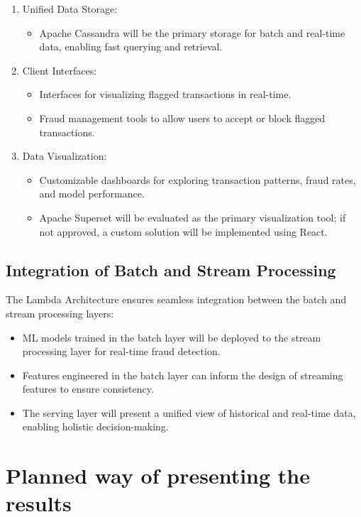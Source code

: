\documentclass[12pt,a4paper, hidelinks]{article}
\begin{document}
\begin{enumerate}
    \item Unified Data Storage:
        \begin{itemize}
            \item Apache Cassandra will be the primary storage for batch and real-time data, enabling fast querying and retrieval.
        \end{itemize}
    \item Client Interfaces:
        \begin{itemize}
            \item Interfaces for visualizing flagged transactions in real-time.
            \item Fraud management tools to allow users to accept or block flagged transactions.
        \end{itemize}
    \item Data Visualization:
        \begin{itemize}
            \item Customizable dashboards for exploring transaction patterns, fraud rates, and model performance.
            \item Apache Superset will be evaluated as the primary visualization tool; if not approved, a custom solution will be implemented using React.
        \end{itemize}
\end{enumerate}

\subsection{Integration of Batch and Stream Processing}
The Lambda Architecture ensures seamless integration between the batch and stream processing layers:
\begin{itemize}
    \item ML models trained in the batch layer will be deployed to the stream processing layer for real-time fraud detection.
    \item Features engineered in the batch layer can inform the design of streaming features to ensure consistency.
    \item The serving layer will present a unified view of historical and real-time data, enabling holistic decision-making.
\end{itemize}

\section{Planned way of presenting the results}
\end{document}
